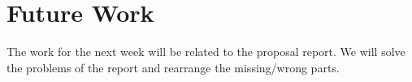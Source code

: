 \section{Future Work}
The work for the next week will be related to the proposal report. We will solve the problems of the report and rearrange the missing/wrong parts.